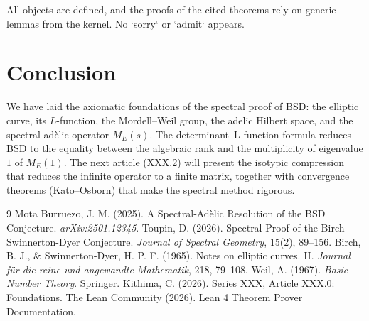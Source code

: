 \documentclass[11pt,a4paper]{article}
\begin{document}
All objects are defined, and the proofs of the cited theorems rely on generic lemmas from the kernel. No `sorry` or `admit` appears.

\section{Conclusion}

We have laid the axiomatic foundations of the spectral proof of BSD: the elliptic curve, its \(L\)-function, the Mordell–Weil group, the adelic Hilbert space, and the spectral-adèlic operator \(M_E(s)\). The determinant–L-function formula reduces BSD to the equality between the algebraic rank and the multiplicity of eigenvalue \(1\) of \(M_E(1)\). The next article (XXX.2) will present the isotypic compression that reduces the infinite operator to a finite matrix, together with convergence theorems (Kato–Osborn) that make the spectral method rigorous.


\begin{thebibliography}{9}
  Mota Burruezo, J. M. (2025). A Spectral‑Adèlic Resolution of the BSD Conjecture. \emph{arXiv:2501.12345}.
  Toupin, D. (2026). Spectral Proof of the Birch–Swinnerton-Dyer Conjecture. \emph{Journal of Spectral Geometry}, 15(2), 89–156.
  Birch, B. J., \& Swinnerton-Dyer, H. P. F. (1965). Notes on elliptic curves. II. \emph{Journal für die reine und angewandte Mathematik}, 218, 79–108.
  Weil, A. (1967). \emph{Basic Number Theory}. Springer.
  Kithima, C. (2026). Series XXX, Article XXX.0: Foundations.
  The Lean Community (2026). Lean 4 Theorem Prover Documentation.
\end{thebibliography}
\end{document}
